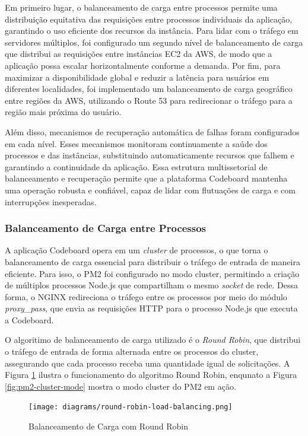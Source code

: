 Em primeiro lugar, o balanceamento de carga entre processos permite uma distribuição equitativa das requisições entre processos individuais da aplicação, garantindo o uso eficiente dos recursos da instância. Para lidar com o tráfego em servidores múltiplos, foi configurado um segundo nível de balanceamento de carga que distribui as requisições entre instâncias EC2 da AWS, de modo que a aplicação possa escalar horizontalmente conforme a demanda. Por fim, para maximizar a disponibilidade global e reduzir a latência para usuários em diferentes localidades, foi implementado um balanceamento de carga geográfico entre regiões da AWS, utilizando o Route 53 para redirecionar o tráfego para a região mais próxima do usuário.

Além disso, mecanismos de recuperação automática de falhas foram configurados em cada nível. Esses mecanismos monitoram continuamente a saúde dos processos e das instâncias, substituindo automaticamente recursos que falhem e garantindo a continuidade da aplicação. Essa estrutura multissetorial de balanceamento e recuperação permite que a plataforma Codeboard mantenha uma operação robusta e confiável, capaz de lidar com flutuações de carga e com interrupções inesperadas.

\subsubsection{Balanceamento de Carga entre Processos}

A aplicação Codeboard opera em um \emph{cluster} de processos, o que torna o balanceamento de carga essencial para distribuir o tráfego de entrada de maneira eficiente. Para isso, o PM2 foi configurado no modo cluster, permitindo a criação de múltiplos processos Node.js que compartilham o mesmo \emph{socket} de rede. Dessa forma, o NGINX redireciona o tráfego entre os processos por meio do módulo \emph{proxy\_pass}, que envia as requisições HTTP para o processo Node.js que executa a Codeboard.

O algoritimo de balanceamento de carga utilizado é o \emph{Round Robin}, que distribui o tráfego de entrada de forma alternada entre os processos do cluster, assegurando que cada processo receba uma quantidade igual de solicitações. A Figura \ref{fig:round-robin-load-balancing} ilustra o funcionamento do algoritmo Round Robin, enqunato a Figura \ref{fig:pm2-cluster-mode} mostra o modo cluster do PM2 em ação.

\begin{figure}[H]
    \centering
    \texttt{[image: diagrams/round-robin-load-balancing.png]}
    \caption{Balanceamento de Carga com Round Robin}
    \label{fig:round-robin-load-balancing}
\end{figure} 

